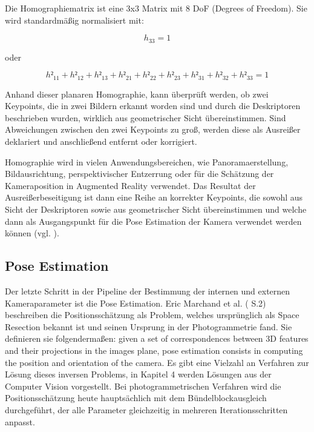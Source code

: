 Die Homographiematrix ist eine 3x3 Matrix mit 8 DoF (Degrees of Freedom). Sie wird standardmäßig normalisiert mit: 

\begin{equation}
h_33 = 1
\end{equation}

oder 

\begin{equation}
h²_{11} + h²_{12} + h²_{13} + h²_{21} + h²_{22} + h²_{23} + h²_{31} + h²_{32} + h²_{33} = 1
\end{equation}

Anhand dieser planaren Homographie, kann überprüft werden, ob zwei Keypoints, die in zwei Bildern erkannt worden sind und durch die Deskriptoren beschrieben wurden, wirklich aus geometrischer Sicht übereinstimmen. Sind Abweichungen zwischen den zwei Keypoints zu groß, werden diese als Ausreißer deklariert und anschließend entfernt oder korrigiert. 

Homographie wird in vielen Anwendungsbereichen, wie Panoramaerstellung, Bildausrichtung, perspektivischer Entzerrung oder für die Schätzung der Kameraposition in Augmented Reality verwendet. Das Resultat der Ausreißerbeseitigung ist dann eine Reihe an korrekter Keypoints, die sowohl aus Sicht der Deskriptoren sowie aus geometrischer Sicht übereinstimmen und welche dann als Ausgangspunkt für die Pose Estimation der Kamera verwendet werden können (vgl. \cite{homography}). 

\subsection{Pose Estimation}

Der letzte Schritt in der Pipeline der Bestimmung der internen und externen Kameraparameter ist die Pose Estimation. Eric Marchand et al. (\cite{pose_estimation} S.2) beschreiben die Positionsschätzung als Problem, welches ursprünglich als \glqq Space Resection\grqq{} bekannt ist und seinen Ursprung in der Photogrammetrie fand. Sie definieren sie folgendermaßen: \glqq given a set of correspondences between 3D features and their projections in the images plane, pose estimation consists in computing the position and orientation of the camera\grqq{}. Es gibt eine Vielzahl an Verfahren zur Lösung dieses inversen Problems, in Kapitel 4 werden Lösungen aus der Computer Vision vorgestellt. Bei photogrammetrischen Verfahren wird die Positionsschätzung heute hauptsächlich mit dem Bündelblockausgleich durchgeführt, der alle Parameter gleichzeitig in mehreren Iterationsschritten anpasst.



